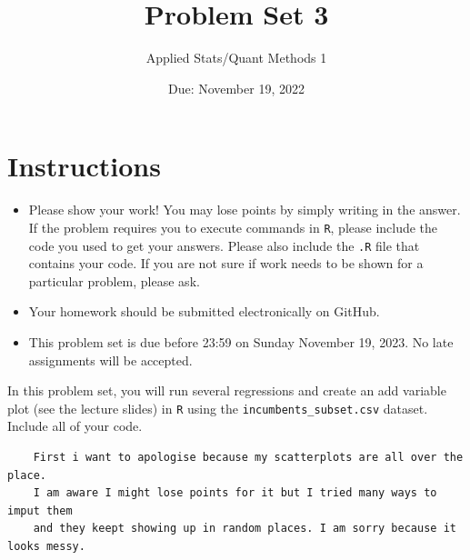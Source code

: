 \documentclass[12pt,letterpaper]{article}
\title{Problem Set 3}
\date{Due: November 19, 2022}
\author{Applied Stats/Quant Methods 1}
\begin{document}
	\maketitle
	\section*{Instructions}
	\begin{itemize}
		\item Please show your work! You may lose points by simply writing in the answer. If the problem requires you to execute commands in \texttt{R}, please include the code you used to get your answers. Please also include the \texttt{.R} file that contains your code. If you are not sure if work needs to be shown for a particular problem, please ask.
	\item Your homework should be submitted electronically on GitHub.
	\item This problem set is due before 23:59 on Sunday November 19, 2023. No late assignments will be accepted.

	\end{itemize}

		\vspace{.25cm}
	
\noindent In this problem set, you will run several regressions and create an add variable plot (see the lecture slides) in \texttt{R} using the \texttt{incumbents\_subset.csv} dataset. Include all of your code.
\begin{verbatim}
	First i want to apologise because my scatterplots are all over the place. 
	I am aware I might lose points for it but I tried many ways to imput them 
	and they keept showing up in random places. I am sorry because it looks messy.
\end{verbatim}

	\vspace{.1cm}
\end{document}
